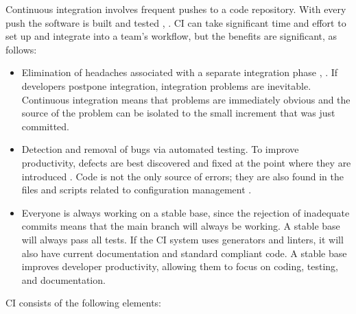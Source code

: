 \documentclass[final, 12pt, 3p, times]{elsarticle}
\begin{document}
Continuous integration involves frequent pushes to a code repository.  With
every push the software is built and tested \cite[p.\ 13]
{HumbleAndFarley2010}, \cite{ShahinEtAl2017, Fowler2006}.  CI can take
significant time and effort to set up and integrate into a team's workflow, but
the benefits are significant, as follows:

\begin{itemize}
	\item Elimination of headaches associated with a separate integration phase
	\cite{Fowler2006}, \cite[p.\ 20]{HumbleAndFarley2010}. If developers
	postpone integration, integration problems are inevitable.  Continuous
	integration means that problems are immediately obvious and the source of
	the problem can be isolated to the small increment that was just committed.
	\item Detection and removal of bugs \cite{Fowler2006} via
	automated testing.  To improve productivity, defects are best discovered and
	fixed at the point where they are introduced \cite[p.\
	23]{HumbleAndFarley2010}.  Code is not the only source of errors; they are
	also found in the files and scripts related to configuration management
	\cite[p.\ 18]{HumbleAndFarley2010}.
	\item Everyone is always working on a stable base, since the rejection of
	inadequate commits means that the main branch will always be working.  A
	stable base will always pass all tests.  If the CI system uses generators
	and linters, it will also have current documentation and standard compliant
	code.  A stable base improves developer productivity, allowing them to focus
	on coding, testing, and documentation.
\end{itemize}

CI consists of the following elements:
\end{document}

